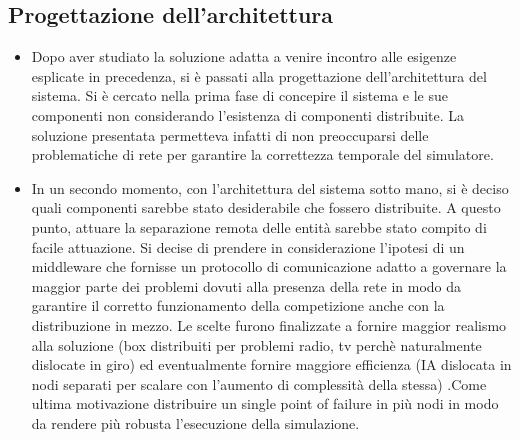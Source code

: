 \subsection{Progettazione dell'architettura}
\begin{itemize}
\item Dopo aver studiato la soluzione adatta a venire incontro alle esigenze esplicate in precedenza, si è passati alla progettazione dell’architettura del sistema. Si è cercato nella prima fase di concepire il sistema e le sue componenti non considerando l’esistenza di componenti distribuite. La soluzione presentata permetteva infatti di non preoccuparsi delle problematiche di rete per garantire la correttezza temporale del simulatore.
\item In un secondo momento, con l’architettura del sistema sotto mano, si è deciso quali componenti sarebbe stato desiderabile che fossero distribuite. A questo punto, attuare la separazione remota delle entità sarebbe stato compito di facile attuazione. Si decise di prendere in considerazione l’ipotesi di un middleware che fornisse un protocollo di comunicazione adatto a governare la maggior parte dei problemi dovuti alla presenza della rete in modo da garantire il corretto funzionamento della competizione anche con la distribuzione in mezzo.
            Le scelte furono finalizzate a fornire maggior realismo alla soluzione (box distribuiti per problemi radio, tv perchè naturalmente dislocate in giro) ed eventualmente fornire maggiore efficienza (IA dislocata in nodi separati per scalare con l'aumento di complessità della stessa) .Come ultima motivazione distribuire un single point of failure in più nodi in modo da rendere più robusta l'esecuzione della simulazione.
\end{itemize}